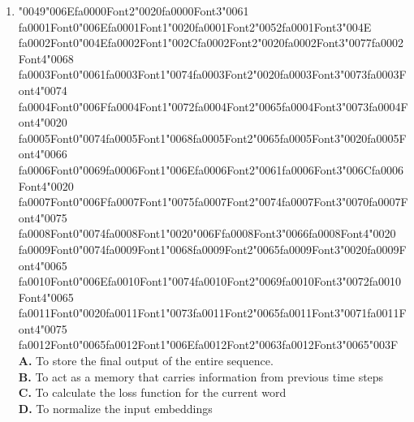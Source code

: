 \documentclass[11pt]{article}
\begin{document}
\begin{enumerate}[label=Q\arabic*., leftmargin=*]
\item {\char"0049}{\char"006E}{\csname fa0000Font2\endcsname\char"0020}{\csname fa0000Font3\endcsname\char"0061} {\csname fa0001Font0\endcsname\char"006E}{\csname fa0001Font1\endcsname\char"0020}{\csname fa0001Font2\endcsname\char"0052}{\csname fa0001Font3\endcsname\char"004E} {\csname fa0002Font0\endcsname\char"004E}{\csname fa0002Font1\endcsname\char"002C}{\csname fa0002Font2\endcsname\char"0020}{\csname fa0002Font3\endcsname\char"0077}{\csname fa0002Font4\endcsname\char"0068} {\csname fa0003Font0\endcsname\char"0061}{\csname fa0003Font1\endcsname\char"0074}{\csname fa0003Font2\endcsname\char"0020}{\csname fa0003Font3\endcsname\char"0073}{\csname fa0003Font4\endcsname\char"0074} {\csname fa0004Font0\endcsname\char"006F}{\csname fa0004Font1\endcsname\char"0072}{\csname fa0004Font2\endcsname\char"0065}{\csname fa0004Font3\endcsname\char"0073}{\csname fa0004Font4\endcsname\char"0020} {\csname fa0005Font0\endcsname\char"0074}{\csname fa0005Font1\endcsname\char"0068}{\csname fa0005Font2\endcsname\char"0065}{\csname fa0005Font3\endcsname\char"0020}{\csname fa0005Font4\endcsname\char"0066} {\csname fa0006Font0\endcsname\char"0069}{\csname fa0006Font1\endcsname\char"006E}{\csname fa0006Font2\endcsname\char"0061}{\csname fa0006Font3\endcsname\char"006C}{\csname fa0006Font4\endcsname\char"0020} {\csname fa0007Font0\endcsname\char"006F}{\csname fa0007Font1\endcsname\char"0075}{\csname fa0007Font2\endcsname\char"0074}{\csname fa0007Font3\endcsname\char"0070}{\csname fa0007Font4\endcsname\char"0075} {\csname fa0008Font0\endcsname\char"0074}{\csname fa0008Font1\endcsname\char"0020}{\char"006F}{\csname fa0008Font3\endcsname\char"0066}{\csname fa0008Font4\endcsname\char"0020} {\csname fa0009Font0\endcsname\char"0074}{\csname fa0009Font1\endcsname\char"0068}{\csname fa0009Font2\endcsname\char"0065}{\csname fa0009Font3\endcsname\char"0020}{\csname fa0009Font4\endcsname\char"0065} {\csname fa0010Font0\endcsname\char"006E}{\csname fa0010Font1\endcsname\char"0074}{\csname fa0010Font2\endcsname\char"0069}{\csname fa0010Font3\endcsname\char"0072}{\csname fa0010Font4\endcsname\char"0065} {\csname fa0011Font0\endcsname\char"0020}{\csname fa0011Font1\endcsname\char"0073}{\csname fa0011Font2\endcsname\char"0065}{\csname fa0011Font3\endcsname\char"0071}{\csname fa0011Font4\endcsname\char"0075} {\csname fa0012Font0\endcsname\char"0065}{\csname fa0012Font1\endcsname\char"006E}{\csname fa0012Font2\endcsname\char"0063}{\csname fa0012Font3\endcsname\char"0065}{\char"003F}\\
\textbf{A.} To store the final output of the entire sequence.\\
\textbf{B.} To act as a memory that carries information from previous time steps\\
\textbf{C.} To calculate the loss function for the current word\\
\textbf{D.} To normalize the input embeddings


\end{enumerate}
\end{document}
